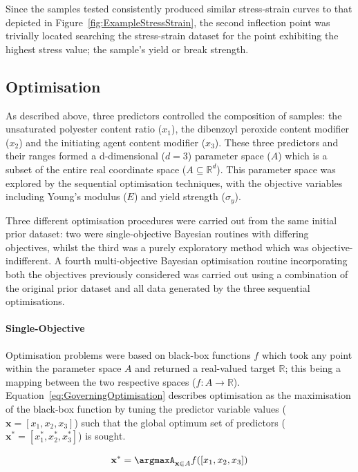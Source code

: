 Since the samples tested consistently produced similar stress-strain curves
 to that depicted in Figure~\ref{fig:ExampleStressStrain}, the second
 inflection point was trivially located searching the stress-strain dataset
 for the point exhibiting the highest stress value; the sample's yield or
 break strength.

\subsection{Optimisation}
As described above, three predictors controlled the composition of samples:
 the unsaturated polyester content ratio (\(x_{1}\)), the dibenzoyl peroxide
 content modifier (\(x_{2}\)) and the initiating agent content modifier
 (\(x_{3}\)).
These three predictors and their ranges formed a d-dimensional (\(d=3\))
 parameter space (\(A\)) which is a subset of the entire real coordinate
 space (\(A\subseteq \mathbb{R}^{d}\)).
This parameter space was explored by the sequential optimisation techniques,
 with the objective variables including Young's modulus (\(E\)) and yield
 strength (\(\sigma_{y}\)).

Three different optimisation procedures were carried out from the same
 initial prior dataset: two were single-objective Bayesian routines with
 differing objectives, whilst the third was a purely exploratory method
 which was objective-indifferent.
A fourth multi-objective Bayesian optimisation routine incorporating both
 the objectives previously considered was carried out using a combination of
 the original prior dataset and all data generated by the three sequential
 optimisations.

\paragraph{Single-Objective}
Optimisation problems were based on black-box functions \(f\) which
 took any point within the parameter space \(A\) and returned a real-valued
 target \(\mathbb{R}\); this being a mapping between the two respective
 spaces (\(f:A\rightarrow \mathbb{R}\)).
Equation~\ref{eq:GoverningOptimisation} describes optimisation as the
 maximisation of the black-box function by tuning the predictor variable
 values (\(\mathbf{x}=[x_{1},x_{2},x_{3}]\)) such that the global optimum
 set of predictors (\(\mathbf{x}^{*}=[x_{1}^{*},x_{2}^{*},x_{3}^{*}]\)) is
 sought.

\begin{equation}\label{eq:GoverningOptimisation}
    \mathbf{x}^{*}=\argmaxA_{\mathbf{x}\in A} f([x_{1},x_{2},x_{3}])
\end{equation}

